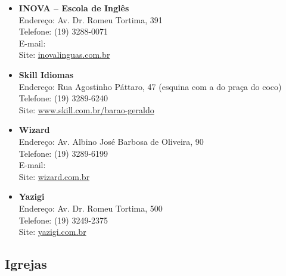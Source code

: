\begin{itemize}
    \item \textbf{INOVA -- Escola de Inglês}
        \\Endereço: Av. Dr. Romeu Tortima, 391
        \\Telefone: (19) 3288-0071
        \\E-mail: 
        \\Site: \url{inovalinguas.com.br}

    \item \textbf{Skill Idiomas}
        \\Endereço: Rua Agostinho Páttaro, 47 (esquina com a do praça do coco)
        \\Telefone: (19) 3289-6240
        \\Site: \url{www.skill.com.br/barao-geraldo}

    \item \textbf{Wizard}
        \\Endereço: Av. Albino José Barbosa de Oliveira, 90
        \\Telefone: (19) 3289-6199
        \\E-mail: 
        \\Site: \url{wizard.com.br}

    \item \textbf{Yazigi}
        \\Endereço: Av. Dr. Romeu Tortima, 500
        \\Telefone: (19) 3249-2375
        \\Site: \url{yazigi.com.br}
\end{itemize}

\subsection{Igrejas}

